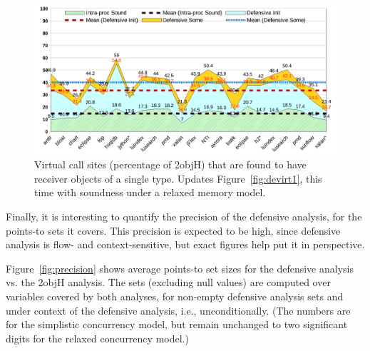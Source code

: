 \begin{figure}[tbhp]
  \begin{minipage}[b]{\linewidth}
    \centering
    \includegraphics[width=\linewidth]{assets/defensive/devirt2.pdf}
  \end{minipage}
  \caption{Virtual call sites (percentage of 2objH) that are found to
    have receiver objects of a single type. Updates
    Figure~\ref{fig:devirt1}, this time with soundness under a relaxed
    memory model.}
   \label{fig:devirt2}
\end{figure}

Finally, it is interesting to quantify the precision of the defensive
analysis, for the points-to sets it covers. This precision is expected
to be high, since defensive analysis is flow- and context-sensitive,
but exact figures help put it in perspective.

Figure~\ref{fig:precision} shows average points-to set sizes for the
defensive analysis vs. the 2objH analysis. The sets (excluding null
values) are computed over variables covered by both analyses, for
non-empty defensive analysis sets and under context 
of the defensive analysis, i.e., unconditionally. (The numbers are for
the simplistic concurrency model, but remain unchanged to two
significant digits for the relaxed concurrency model.)



